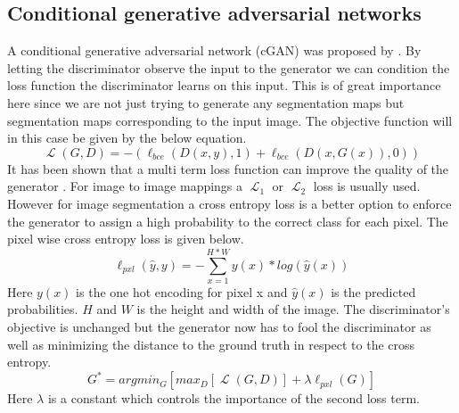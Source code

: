 \documentclass{kththesis}
\DeclareMathOperator{\Lagr}{\mathcal{L}}
\begin{document}
\subsection{Conditional generative adversarial networks}
A conditional generative adversarial network (cGAN) was proposed by \parencite{mirza_conditional_2014}.
By letting the discriminator observe the input to the generator we can condition the loss function the discriminator learns on this input. This is of great importance here since we are not just trying to generate any segmentation maps but segmentation maps corresponding to the input image. The objective function will in this case be given by the below equation.
\begin{equation}
\Lagr(G, D) =  -(\ell_{bce}(D(x, y), 1) + \ell_{bce}(D(x, G(x)), 0))\label{eq:cgan}
\end{equation}
It has been shown that a multi term loss function can improve the quality of the generator \parencite{pathak_context_2016, isola_image--image_2016}. For image to image mappings a $\Lagr_1$ or $\Lagr_2$ loss is usually used. However for image segmentation a cross entropy loss is a better option to enforce the generator to assign a high probability to the correct class for each pixel. The pixel wise cross entropy loss is given below.
\begin{equation}\label{eq:mce}
\ell_{pxl}(\hat{y}, y) = - \sum_{x=1}^{H*W}y(x)*log(\hat{y}(x))
\end{equation}
Here $y(x)$ is the one hot encoding for pixel x and $\hat{y}(x)$ is the predicted probabilities. $H$ and $W$ is the height and width of the image. The discriminator's objective is unchanged but the generator now has to fool the discriminator as well as minimizing the distance to the ground truth in respect to the cross entropy.
\begin{equation}
G^{*}=argmin_{G}[max_{D}[\Lagr(G, D)] + \lambda \ell_{pxl}(G)]
\end{equation}
Here $\lambda$ is a constant which controls the importance of the second  loss term.
\end{document}
